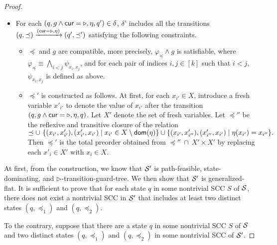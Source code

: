 \begin{appendix}
\begin{proof}
\begin{itemize}
\item For each $(q, g \wedge \mathsf{cur} = \triangleright, \eta, q') \in \delta$, $\delta'$ includes all the transitions $(q, \preceq) \xrightarrow{(\mathsf{cur} = \triangleright, \eta)} (q', \preceq')$ satisfying the following constraints.
\begin{itemize}
\item $\preceq$ and $g$ are compatible, more precisely, $\varphi_{\preceq} \wedge g$ is satisfiable, where $\varphi_{\preceq} \equiv \bigwedge \limits_{ i< j} \psi_{x_i, x_j}$, and for each pair of indices $i, j \in [k]$ such that $i < j$, $\psi_{x_i, x_j}$ is defined as above. 
%
\item $\preceq'$ is constructed as follows.
At first, for each $x_{i'} \in X$, introduce a fresh variable $x'_{i'}$ to denote the value of $x_{i'}$ after the transition $(q, g \wedge \mathsf{cur} = \triangleright, \eta, q)$. Let $X'$ denote the set of fresh variables. Let $\preceq''$ be the reflexive and transitive closure of the relation
$
\preceq \cup\ \{(x_{i'}, x'_{i'}), (x'_{i'}, x_{i'}) \mid x_{i'} \in X \setminus \mathsf{dom}(\eta)\}  \cup 
 \{(x_{i'}, x'_{i''}), (x'_{i''}, x_{i'}) \mid \eta(x_{i'})=x_{i''}\}.
$ 
Then $\preceq'$ is the total preorder obtained from $\preceq'' \ \cap\ X' \times X'$ by replacing each $x'_i \in X'$ with $x_i \in X$.
\end{itemize}
\end{itemize}

At first, from the construction, we know that ${\mathcal{S} }'$ is path-feasible, state-dominating, and $\triangleright$-transition-guard-tree. We then show that ${\mathcal{S} }'$ is generalized-flat. It is sufficient to prove that for each state $q$ in some nontrivial SCC $S$ of ${\mathcal{S} }$, there does not exist a nontrivial SCC in ${\mathcal{S} }'$ that includes at least two distinct states $(q, \preceq_1)$ and $(q, \preceq_2)$.

To the contrary, suppose that there are a state $q$ in some nontrivial SCC $S$ of ${\mathcal{S} }$ and two distinct states $(q, \preceq_1)$ and $(q, \preceq_2)$ in some nontrivial SCC of ${\mathcal{S} }'$.


\end{proof}
\end{appendix}
